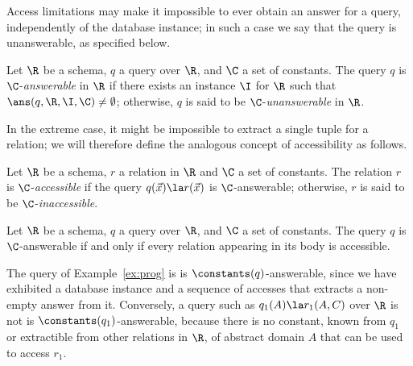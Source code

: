 Access limitations may make it impossible to ever obtain an answer for a query, independently of the database instance; in such a case we say that the query is unanswerable, as specified below.
\begin{definition}\label{def:answerable}
	Let $\R$ be a schema, $q$ a query over $\R$, and $\C$ a set of constants.
	The query $q$ is $\C$-\emph{answerable} in $\R$ if there exists an instance $\I$ for $\R$ such that $\ans(q,\R,\I,\C)\neq \emptyset$; otherwise, $q$ is said to be $\C$-\emph{unanswerable} in $\R$.
\end{definition}


In the extreme case, it might be impossible to extract a single tuple for a relation; we will therefore define the analogous concept of accessibility as follows.
\begin{definition}\label{def:accessible}
    Let $\R$ be a schema, $r$ a relation in $\R$ and $\C$ a set of constants.
    The relation $r$ is $\C$-\emph{accessible} if the query $q(\vec x) \la r(\vec x)$ is $\C$-answerable; otherwise, $r$ is said to be $\C$-\emph{inaccessible}.
\end{definition}

\begin{proposition}\label{pro:answerable-if-accessible}
    Let $\R$ be a schema, $q$ a query over $\R$, and $\C$ a set of constants.
    The query $q$ is $\C$-answerable if and only if every relation appearing in its body is accessible.
\end{proposition}

\begin{example}\label{ex:answerability}
	The query of Example~\ref{ex:prog} is is $\constants(q)$-answerable, since we have exhibited a database instance and a sequence of accesses that extracts a non-empty answer from it. Conversely, a query such as $q_1(A)\la r_1(A,C)$ over $\R$ is not is $\constants(q_1)$-answerable, because there is no constant, known from $q_1$ or extractible from other relations in $\R$, of abstract domain $A$ that can be used to access $r_1$.
\end{example}
